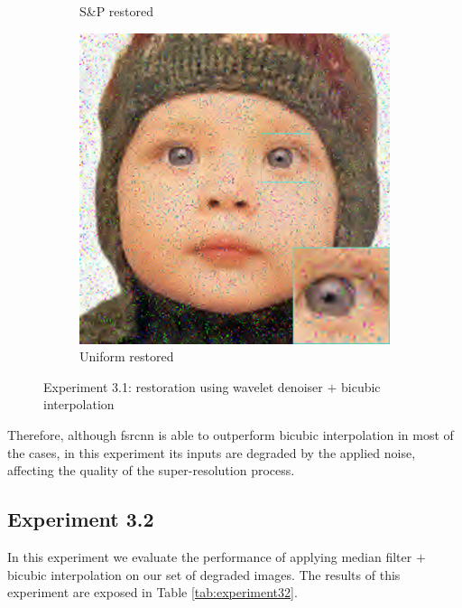 \begin{figure}
\begin{subfigure}{0.24\textwidth}
		\caption{S\&P restored}
	\end{subfigure}
	\begin{subfigure}{0.24\textwidth}
		\includegraphics[width=\textwidth]{images/exp3.1/uniform.png}
		\caption{Uniform restored}
	\end{subfigure}
	\caption{Experiment 3.1: restoration using wavelet denoiser $+$ bicubic interpolation}
	\label{fig:exp3.1}
\end{figure}

Therefore, although \gls{fsrcnn} is able to outperform bicubic interpolation in most of the cases, in this experiment its inputs are degraded by the applied noise, affecting the quality of the super-resolution process.

\newpage\subsection{Experiment 3.2}
In this experiment we evaluate the performance of applying median filter $+$ bicubic interpolation on our set of degraded images. The results of this experiment are exposed in Table \ref{tab:experiment32}.


